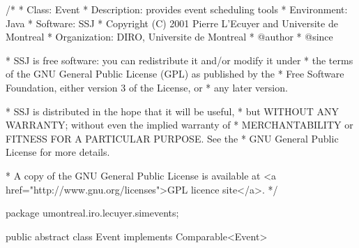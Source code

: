 \begin{code}
\begin{hide}
/*
 * Class:        Event
 * Description:  provides event scheduling tools
 * Environment:  Java
 * Software:     SSJ 
 * Copyright (C) 2001  Pierre L'Ecuyer and Universite de Montreal
 * Organization: DIRO, Universite de Montreal
 * @author       
 * @since

 * SSJ is free software: you can redistribute it and/or modify it under
 * the terms of the GNU General Public License (GPL) as published by the
 * Free Software Foundation, either version 3 of the License, or
 * any later version.

 * SSJ is distributed in the hope that it will be useful,
 * but WITHOUT ANY WARRANTY; without even the implied warranty of
 * MERCHANTABILITY or FITNESS FOR A PARTICULAR PURPOSE.  See the
 * GNU General Public License for more details.

 * A copy of the GNU General Public License is available at
   <a href="http://www.gnu.org/licenses">GPL licence site</a>.
 */
\end{hide}
package umontreal.iro.lecuyer.simevents;

public abstract class Event implements Comparable<Event>\begin{hide} {

   protected Simulator sim;
   //simulator linked with the current event

   protected double priority;
   //priority of the event. Priority is a second parameter (after eventTime)
   // used to class events for their running order, in the EventList.

   protected double eventTime;
   // Planned time of occurence of this event.  Negative if not planned.
   // Is protected because it is used (changed) in Process.

   // Replace that with instanceof simProcess to completely detach processes.
   // protected boolean isProcess = false;
   // Will be true for objects of the subclass Process of the class Event.
   // (i.e., true if this event is a process.)

   private int myra = 0;
   // A new event must always occur after those with same time and 
   // same priority in the Event list. myra is used for that in
   // SplayTree.java.

   // For internal use
   public final int getRa() { return myra; }
   public final void setRa(int r) { myra = r; }
\end{hide}
\end{code}


